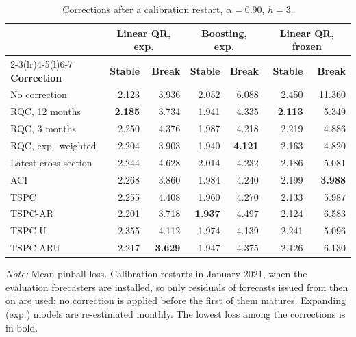 \begin{table}[t]
\caption{Corrections after a calibration restart, $\alpha=0.90$, $h=3$.\label{tab:primary}}
\centering\footnotesize\setlength{\tabcolsep}{4pt}
\begin{tabular*}{\textwidth}{@{\extracolsep\fill}lrrrrrr@{}}
\toprule
 & \multicolumn{2}{c}{\textbf{Linear QR, exp.}} & \multicolumn{2}{c}{\textbf{Boosting, exp.}} & \multicolumn{2}{c}{\textbf{Linear QR, frozen}} \\
\cmidrule(lr){2-3}\cmidrule(lr){4-5}\cmidrule(l){6-7}
\textbf{Correction} & \textbf{Stable} & \textbf{Break} & \textbf{Stable} & \textbf{Break} & \textbf{Stable} & \textbf{Break} \\
\midrule
No correction & 2.123 & 3.936 & 2.052 & 6.088 & 2.450 & 11.360 \\
\addlinespace
RQC, 12 months & \textbf{2.185} & 3.734 & 1.941 & 4.335 & \textbf{2.113} & 5.349 \\
RQC, 3 months & 2.250 & 4.376 & 1.987 & 4.218 & 2.219 & 4.886 \\
RQC, exp.\ weighted & 2.204 & 3.903 & 1.940 & \textbf{4.121} & 2.163 & 4.820 \\
Latest cross-section & 2.244 & 4.628 & 2.014 & 4.232 & 2.186 & 5.081 \\
ACI & 2.268 & 3.860 & 1.984 & 4.240 & 2.199 & \textbf{3.988} \\
\addlinespace
TSPC & 2.255 & 4.408 & 1.960 & 4.270 & 2.133 & 5.987 \\
TSPC-AR & 2.201 & 3.718 & \textbf{1.937} & 4.497 & 2.124 & 6.583 \\
TSPC-U & 2.355 & 4.112 & 1.974 & 4.139 & 2.241 & 5.096 \\
TSPC-ARU & 2.217 & \textbf{3.629} & 1.947 & 4.375 & 2.126 & 6.130 \\
\bottomrule
\end{tabular*}
\begin{tablenotes}
\item \textit{Note:} Mean pinball loss. Calibration restarts in January 2021, when the evaluation forecasters are installed, so only residuals of forecasts issued from then on are used; no correction is applied before the first of them matures. Expanding (exp.) models are re-estimated monthly. The lowest loss among the corrections is in bold.
\end{tablenotes}
\end{table}
